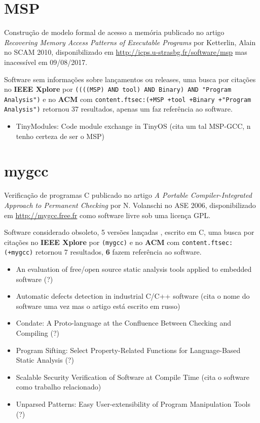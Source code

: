 \section{MSP}

Construção de modelo formal de acesso a memória
publicado no artigo {\it Recovering Memory Access Patterns of Executable Programs}
por Ketterlin, Alain
no SCAM 2010,
disponibilizado em \url{http://icps.u-strasbg.fr/software/msp}
mas inacessível em 09/08/2017.

Software sem informações sobre lançamentos ou releases,
uma busca por citações no {\bf IEEE Xplore} por
\texttt{((((MSP) AND tool) AND Binary) AND "Program Analysis")}
e no {\bf ACM} com
\texttt{content.ftsec:(+MSP +tool +Binary +"Program Analysis")}
retornou
37 resultados,
apenas um faz referência ao software.

\begin{itemize}
\item TinyModules: Code module exchange in TinyOS (cita um tal MSP-GCC, n tenho certeza de ser o MSP)
\end{itemize}

\section{mygcc}

Verificação de programas C
publicado no artigo {\it A Portable Compiler-Integrated Approach to Permanent Checking}
por N. Volanschi
no ASE 2006,
disponibilizado em \url{http://mygcc.free.fr}
como software livre
sob uma licença GPL.

Software considerado obsoleto,
5 versões lançadas
,
escrito em C,
uma busca por citações no {\bf IEEE Xplore} por
\texttt{(mygcc)}
e no {\bf ACM} com
\texttt{content.ftsec:(+mygcc)}
retornou
7 resultados,
{\bf 6} fazem referência ao software.

\begin{itemize}
\item An evaluation of free/open source static analysis tools applied to embedded software (?)
\item Automatic defects detection in industrial C/C++ software (cita o nome do software uma vez mas o artigo está escrito em russo)
\item Condate: A Proto-language at the Confluence Between Checking and Compiling (?)
\item Program Sifting: Select Property-Related Functions for Language-Based Static Analysis (?)
\item Scalable Security Verification of Software at Compile Time (cita o software como trabalho relacionado)
\item Unparsed Patterns: Easy User-extensibility of Program Manipulation Tools (?)
\end{itemize}

